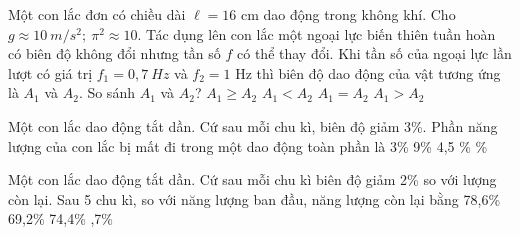 \begin{vidu}%
Một con lắc đơn có chiều dài $\ell =16$ cm dao động trong không khí. Cho $g\approx 10\ m/s^2;\ \pi^2\approx 10.$ Tác dụng lên con lắc một ngoại lực biến thiên tuần hoàn có biên độ không đổi nhưng tần số $f$ có thể thay đổi. Khi tần số của ngoại lực lần lượt có giá trị $f_1=0,7\ Hz$ và $f_2 = 1$ Hz thì biên độ dao động của vật tương ứng là $A_1$ và $A_2$. So sánh $A_1$ và $A_2$?
\choice
{$A_1\ge A_2$}
{\True $A_1<A_2$}
{$A_1=A_2$}
{$A_1>A_2$}
\end{vidu} %
\begin{vidu}%
Một con lắc dao động tắt dần. Cứ sau mỗi chu kì, biên độ giảm 3\%. Phần năng lượng của con lắc bị mất đi trong một dao động toàn phần là
\choice
{3\%}
{9\%}
{4,5 \%}
{\%}
\end{vidu} %
\begin{vidu}%
Một con lắc dao động tắt dần. Cứ sau mỗi chu kì biên độ giảm 2\% so với lượng còn lại. Sau 5 chu kì, so với năng lượng ban đầu, năng lượng còn lại bằng
\choice
{78,6\%}
{69,2\%}
{74,4\%}
{,7\%}
\end{vidu} %
